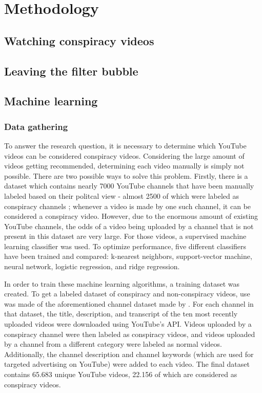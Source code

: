 \documentclass[../main.tex]{subfiles}
\begin{document}
\section{Methodology}
\subsection{Watching conspiracy videos}

\subsection{Leaving the filter bubble}

\subsection{Machine learning}
\subsubsection{Data gathering}
To answer the research question, it is necessary to determine which YouTube videos can be considered
conspiracy videos. Considering the large amount of videos getting recommended, determining each video
manually is simply not possible. There are two possible ways to solve this problem. Firstly, there is a
dataset which contains nearly 7000 YouTube channels that have been manually labeled based on their
politcal view - almost 2500 of which were labeled as conspiracy channels \citep{ledwich2019algorithmic};
whenever a video is made by one such channel, it can be considered a conspiracy video. However, due to
the enormous amount of existing YouTube channels, the odds of a video being uploaded by a channel that
is not present in this dataset are very large. For those videos, a supervised machine learning
classifier was used. To optimize performance, five different classifiers have been trained and compared:
k-nearest neighbors, support-vector machine, neural network, logistic regression, and ridge regression. 

In order to train these machine learning algorithms, a training dataset was created. To get a labeled
dataset of conspiracy and non-conspiracy videos, use was made of the aforementioned channel dataset made
by \citet{ledwich2019algorithmic}. For each channel in that dataset, the title, description, and
transcript of the ten most recently uploaded videos were downloaded using YouTube's API. Videos uploaded
by a conspiracy channel were then labeled as conspiracy videos, and videos uploaded by a channel from a
different category were labeled as normal videos. Additionally, the channel description and channel
keywords (which are used for targeted advertising on YouTube) were added to each video. The final
dataset contains 65.683 unique YouTube videos, 22.156 of which are considered as conspiracy videos. 
\end{document}

